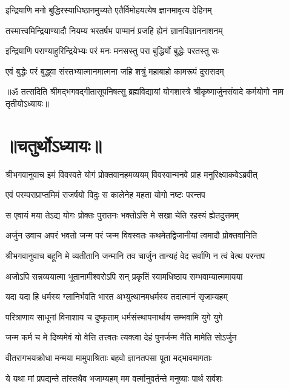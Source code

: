\twolineshloka
{इन्द्रियाणि मनो बुद्धिरस्याधिष्ठानमुच्यते}
{एतैर्विमोहयत्येष ज्ञानमावृत्य देहिनम्}%

\twolineshloka
{तस्मात्त्वमिन्द्रियाण्यादौ नियम्य भरतर्षभ}
{पाप्मानं प्रजहि ह्येनं ज्ञानविज्ञाननाशनम्}%

\twolineshloka
{इन्द्रियाणि पराण्याहुरिन्द्रियेभ्यः परं मनः}
{मनसस्तु परा बुद्धिर्यो बुद्धेः परतस्तु सः}%

\twolineshloka
{एवं बुद्धेः परं बुद्ध्वा संस्तभ्यात्मानमात्मना}
{जहि शत्रुं महाबाहो कामरूपं दुरासदम्}%

{॥ॐ तत्सदिति श्रीमद्भगवद्गीतासूपनिषत्सु ब्रह्मविद्यायां योगशास्त्रे श्रीकृष्णार्जुनसंवादे कर्मयोगो नाम तृतीयोऽध्यायः॥}

\section{॥चतुर्थोऽध्यायः॥}
{श्रीभगवानुवाच}
\twolineshloka
{इमं विवस्वते योगं प्रोक्तवानहमव्ययम्}
{विवस्वान्मनवे प्राह मनुरिक्ष्वाकवेऽब्रवीत्}%

\twolineshloka
{एवं परम्पराप्राप्तमिमं राजर्षयो विदुः}
{स कालेनेह महता योगो नष्टः परन्तप}%

\twolineshloka
{स एवायं मया तेऽद्य योगः प्रोक्तः पुरातनः}
{भक्तोऽसि मे सखा चेति रहस्यं ह्येतदुत्तमम्}%

{अर्जुन उवाच}
\twolineshloka
{अपरं भवतो जन्म परं जन्म विवस्वतः}
{कथमेतद्विजानीयां त्वमादौ प्रोक्तवानिति}%

{श्रीभगवानुवाच}
\twolineshloka
{बहूनि मे व्यतीतानि जन्मानि तव चार्जुन}
{तान्यहं वेद सर्वाणि न त्वं वेत्थ परन्तप}%

\twolineshloka
{अजोऽपि सन्नव्ययात्मा भूतानामीश्वरोऽपि सन्}
{प्रकृतिं स्वामधिष्ठाय सम्भवाम्यात्ममायया}%

\twolineshloka
{यदा यदा हि धर्मस्य ग्लानिर्भवति भारत}
{अभ्युत्थानमधर्मस्य तदात्मानं सृजाम्यहम्}%

\twolineshloka
{परित्राणाय साधूनां विनाशाय च दुष्कृताम्}
{धर्मसंस्थापनार्थाय सम्भवामि युगे युगे}%

\twolineshloka
{जन्म कर्म च मे दिव्यमेवं यो वेत्ति तत्त्वतः}
{त्यक्त्वा देहं पुनर्जन्म नैति मामेति सोऽर्जुन}%

\twolineshloka
{वीतरागभयक्रोधा मन्मया मामुपाश्रिताः}
{बहवो ज्ञानतपसा पूता मद्भावमागताः}%

\twolineshloka
{ये यथा मां प्रपद्यन्ते तांस्तथैव भजाम्यहम्}
{मम वर्त्मानुवर्तन्ते मनुष्याः पार्थ सर्वशः}%

